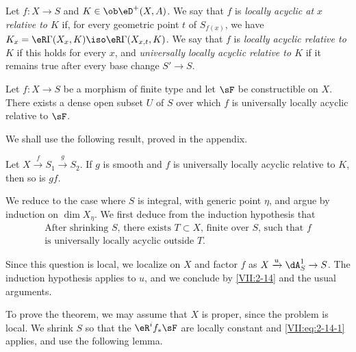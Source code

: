 \documentclass[oneside]{book}
\begin{document}
\begin{definition_}\label{VII:2-12}
Let $f:X\to S$ and $K\in \ob\eD^+(X,A)$. We say that $f$ is \emph{locally
acyclic at $x$ relative to $K$} if, for every geometric point $t$ of
$S_{f(x)}$, we have $K_x=\eR\Gamma(X_x,K)\iso \eR\Gamma(X_{x,t},K)$. We say
that $f$ is \emph{locally acyclic relative to $K$} if this holds for every
$x$, and \emph{universally locally acyclic relative to $K$} if it remains true
after every base change $S' \to S$.
\end{definition_}





\begin{theorem_}\label{VII:2-13}
Let $f:X\to S$ be a morphism of finite type and let $\sF$ be constructible on
$X$. There exists a dense open subset $U$ of $S$ over which $f$ is universally
locally acyclic relative to $\sF$.
\end{theorem_}

We shall use the following result, proved in the appendix.





\begin{lemma_}\label{VII:2-14}
Let $X\xrightarrow f S_1 \xrightarrow g S_2$. If $g$ is smooth and $f$ is
universally locally acyclic relative to $K$, then so is $g f$.
\end{lemma_}

We reduce to the case where $S$ is integral, with generic point $\eta$, and
argue by induction on $\dim{X_\eta}$. We first deduce from the induction
hypothesis that
\begin{equation*}\tag{A}\label{VII:eq:2-14-1}
  \begin{array}{c}
    \text{After shrinking $S$, there exists $T\subset X$, finite over $S$, such that $f$} \\
    \text{is universally locally acyclic outside $T$.} 
  \end{array}
\end{equation*}

Since this question is local, we localize on $X$ and factor $f$ as
$X\xrightarrow u \dA_S^1 \to S$. The induction hypothesis applies
to $u$, and we conclude by \ref{VII:2-14} and the usual arguments.

To prove the theorem, we may assume that $X$ is proper, since the problem is
local. We shrink $S$ so that the $\eR^i f_\ast \sF$ are locally constant and
\eqref{VII:eq:2-14-1} applies, and use the following lemma.
\end{document}

